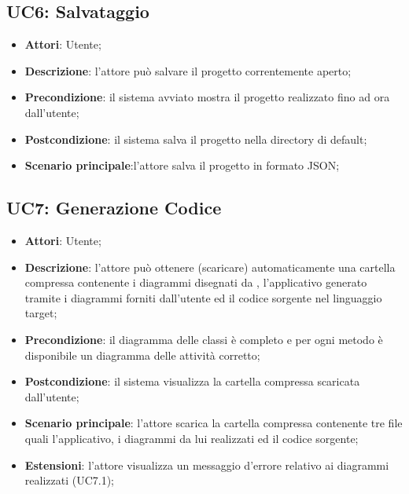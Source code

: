 \subsection{UC6: Salvataggio}
\label{UC6}
\begin{itemize}
	\item \textbf{Attori}: Utente;
	\item \textbf{Descrizione}: l'attore può salvare il progetto correntemente aperto;
	\item \textbf{Precondizione}: il sistema avviato mostra il progetto realizzato fino ad ora dall'utente;
	\item \textbf{Postcondizione}: il sistema salva il progetto nella directory di default;
	\item \textbf{Scenario principale}:l'attore salva il progetto in formato JSON;
\end{itemize}

\subsection{UC7: Generazione Codice}
\label{UC7}
\begin{itemize}
	\item \textbf{Attori}: Utente;
	\item \textbf{Descrizione}: l'attore può ottenere (scaricare) automaticamente una cartella compressa contenente i diagrammi disegnati da \proj{}, l'applicativo generato tramite i diagrammi forniti dall'utente ed il codice sorgente nel linguaggio target;
	\item \textbf{Precondizione}: il diagramma delle classi è completo e per ogni metodo è disponibile un diagramma delle attività corretto;
	\item \textbf{Postcondizione}: il sistema visualizza la cartella compressa scaricata dall'utente;
	\item \textbf{Scenario principale}: l'attore scarica la cartella compressa contenente tre file quali l'applicativo, i diagrammi da lui realizzati ed il codice sorgente;
	\item \textbf{Estensioni}: l'attore visualizza un messaggio d'errore relativo ai diagrammi realizzati (UC7.1); 
\end{itemize}


